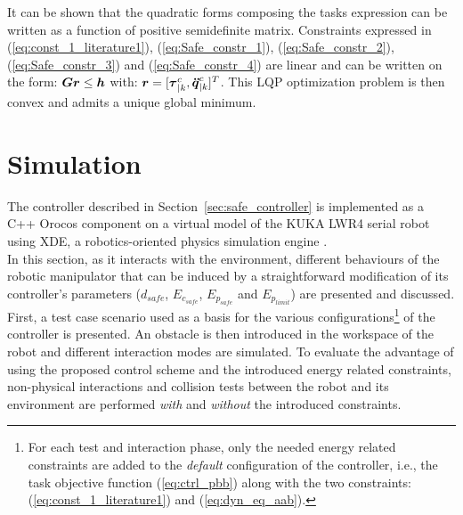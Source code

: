 It can be shown that the quadratic forms composing the tasks expression can be written as a function of positive semidefinite matrix. Constraints expressed in (\ref{eq:const_1_literature1}), (\ref{eq:Safe_constr_1}), (\ref{eq:Safe_constr_2}), (\ref{eq:Safe_constr_3}) and (\ref{eq:Safe_constr_4}) are linear and can be written on the form: $\mbox{\boldmath${G}$} \mbox{\boldmath${r}$} \leq \mbox{\boldmath${h}$}$ with:  $\mbox{\boldmath${r}$} = [\mbox{\boldmath${\tau}$}_{|k}^{c}, \mbox{\boldmath${\ddot{q}}$}_{|k}^{c}]^{T}$. This LQP optimization problem is then convex and admits a unique global minimum.
\section{Simulation}
\label{sec:contrl12}
The controller described in Section~\ref{sec:safe_controller} is implemented as a C++ Orocos component \allowbreak\cite{rtt-url} on a virtual model of the KUKA LWR4 serial robot using XDE, a robotics-oriented physics simulation engine \cite{merlhiot2012}.
\\
In this section, as it interacts with the environment, different behaviours of the robotic manipulator that can be induced by a straightforward modification of its controller's parameters ($d_{safe}$, $E_{c_{safe}}$, $E_{p_{safe}}$ and $E_{p_{limit}}$) are presented and discussed. First, a test case scenario used as a basis for the various configurations\footnote{For each test and interaction phase, only the needed energy related constraints are added to the \textit{default} configuration of the controller, i.e., the task objective function (\ref{eq:ctrl_pbb}) along with the two constraints:  (\ref{eq:const_1_literature1}) and (\ref{eq:dyn_eq_aab}).} of the controller is presented. An obstacle is then introduced in the workspace of the robot and different interaction modes are simulated. To evaluate the advantage of using the proposed control scheme and the introduced energy related constraints, non-physical interactions and collision tests between the robot and its environment are performed \textit{with} and \textit{without} the introduced constraints.
